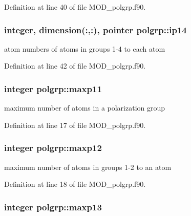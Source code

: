 Definition at line 40 of file M\-O\-D\-\_\-polgrp.\-f90.

\hypertarget{classpolgrp_a253a7d7e48f57b4f2c9f1680ab1dc309}{
\subsubsection[{ip14}]{\setlength{\rightskip}{0pt plus 5cm}integer, dimension(\-:,\-:), pointer polgrp\-::ip14}}\label{classpolgrp_a253a7d7e48f57b4f2c9f1680ab1dc309}


atom numbers of atoms in groups 1-\/4 to each atom 



Definition at line 42 of file M\-O\-D\-\_\-polgrp.\-f90.

\hypertarget{classpolgrp_a639d70e86d1cffb5e1f57f85dcb044b1}{
\subsubsection[{maxp11}]{\setlength{\rightskip}{0pt plus 5cm}integer polgrp\-::maxp11}}\label{classpolgrp_a639d70e86d1cffb5e1f57f85dcb044b1}


maximum number of atoms in a polarization group 



Definition at line 17 of file M\-O\-D\-\_\-polgrp.\-f90.

\hypertarget{classpolgrp_ada0249a564d7182b65235560758f5737}{
\subsubsection[{maxp12}]{\setlength{\rightskip}{0pt plus 5cm}integer polgrp\-::maxp12}}\label{classpolgrp_ada0249a564d7182b65235560758f5737}


maximum number of atoms in groups 1-\/2 to an atom 



Definition at line 18 of file M\-O\-D\-\_\-polgrp.\-f90.

\hypertarget{classpolgrp_aaaadc556f3d3361854cf9247f07a89db}{
\subsubsection[{maxp13}]{\setlength{\rightskip}{0pt plus 5cm}integer polgrp\-::maxp13}}\label{classpolgrp_aaaadc556f3d3361854cf9247f07a89db}


